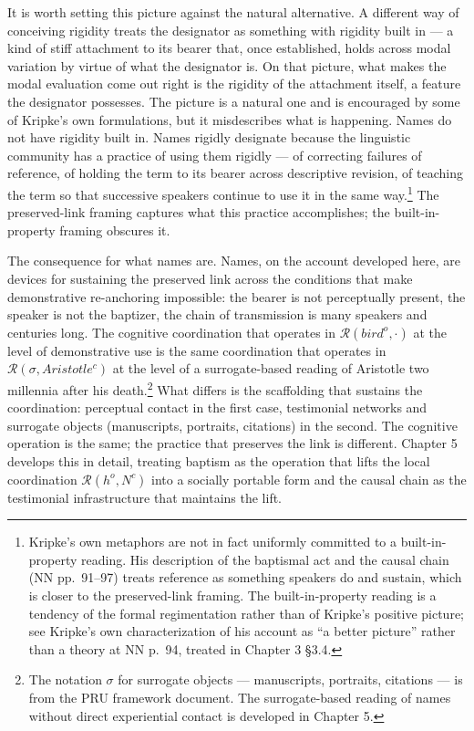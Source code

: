 \documentclass[12pt,a4paper]{article}
\begin{document}
It is worth setting this picture against the natural alternative. A different way of conceiving rigidity treats the designator as something with rigidity built in --- a kind of stiff attachment to its bearer that, once established, holds across modal variation by virtue of what the designator is. On that picture, what makes the modal evaluation come out right is the rigidity of the attachment itself, a feature the designator possesses. The picture is a natural one and is encouraged by some of Kripke's own formulations, but it misdescribes what is happening. Names do not have rigidity built in. Names rigidly designate because the linguistic community has a practice of using them rigidly --- of correcting failures of reference, of holding the term to its bearer across descriptive revision, of teaching the term so that successive speakers continue to use it in the same way.\footnote{Kripke's own metaphors are not in fact uniformly committed to a built-in-property reading. His description of the baptismal act and the causal chain (NN pp.~91--97) treats reference as something speakers do and sustain, which is closer to the preserved-link framing. The built-in-property reading is a tendency of the formal regimentation rather than of Kripke's positive picture; see Kripke's own characterization of his account as ``a better picture'' rather than a theory at NN p.~94, treated in Chapter 3 §3.4.} The preserved-link framing captures what this practice accomplishes; the built-in-property framing obscures it.

The consequence for what names are. Names, on the account developed here, are devices for sustaining the preserved link across the conditions that make demonstrative re-anchoring impossible: the bearer is not perceptually present, the speaker is not the baptizer, the chain of transmission is many speakers and centuries long. The cognitive coordination that operates in \(\mathcal{R}(bird^o, \cdot)\) at the level of demonstrative use is the same coordination that operates in \(\mathcal{R}(\sigma, Aristotle^c)\) at the level of a surrogate-based reading of Aristotle two millennia after his death.\footnote{The notation \(\sigma\) for surrogate objects --- manuscripts, portraits, citations --- is from the PRU framework document. The surrogate-based reading of names without direct experiential contact is developed in Chapter 5.} What differs is the scaffolding that sustains the coordination: perceptual contact in the first case, testimonial networks and surrogate objects (manuscripts, portraits, citations) in the second. The cognitive operation is the same; the practice that preserves the link is different. Chapter 5 develops this in detail, treating baptism as the operation that lifts the local coordination \(\mathcal{R}(h^o, N^c)\) into a socially portable form and the causal chain as the testimonial infrastructure that maintains the lift.
\end{document}
